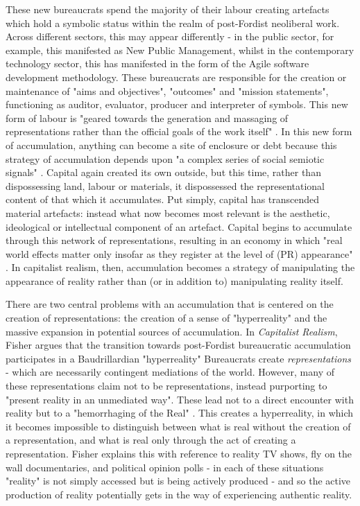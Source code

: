 These new bureaucrats spend the majority of their labour creating artefacts which hold a symbolic status within the realm of post-Fordist neoliberal work. Across different sectors, this may appear differently - in the public sector, for example, this manifested as New Public Management, whilst in the contemporary technology sector, this has manifested in the form of the Agile software development methodology. These bureaucrats are responsible for the creation or maintenance of "aims and objectives", "outcomes" and "mission statements", functioning as auditor, evaluator, producer and interpreter of symbols. This new form of labour is "geared towards the generation and massaging of representations rather than the official goals of the work itself" \citep[p. 46]{fisher_capitalist_2009}. In this new form of accumulation, anything can become a site of enclosure or debt because this strategy of accumulation depends upon "a complex series of social semiotic signals" \citep[p. 54]{fisher_capitalist_2009}. Capital again created its own outside, but this time, rather than dispossessing land, labour or materials, it dispossessed the representational content of that which it accumulates. Put simply, capital has transcended material artefacts: instead what now becomes most relevant is the aesthetic, ideological or intellectual component of an artefact. Capital begins to accumulate through this network of representations, resulting in an economy in which "real world effects matter only insofar as they register at the level of (PR) appearance" \citep[p. 46]{fisher_capitalist_2009}. In capitalist realism, then, accumulation becomes a strategy of manipulating the appearance of reality rather than (or in addition to) manipulating reality itself.  

There are two central problems with an accumulation that is centered on the creation of representations: the creation of a sense of "hyperreality" and the massive expansion in potential sources of accumulation. In \emph{Capitalist Realism}, Fisher argues that the transition towards post-Fordist bureaucratic accumulation participates in a Baudrillardian "hyperreality" \citeyearpar[p. 52]{fisher_capitalist_2009} Bureaucrats create \emph{representations} - which are necessarily contingent mediations of the world. However, many of these representations claim not to be representations, instead purporting to "present reality in an unmediated way". These lead not to a direct encounter with reality but to a "hemorrhaging of the Real" \citep[p. 52]{fisher_capitalist_2009}. This creates a hyperreality, in which it becomes impossible to distinguish between what is real without the creation of a representation, and what is real only through the act of creating a representation. Fisher explains this with reference to reality TV shows, fly on the wall documentaries, and political opinion polls - in each of these situations "reality" is not simply accessed but is being actively produced - and so the active production of  reality potentially gets in the way of experiencing authentic reality. 

